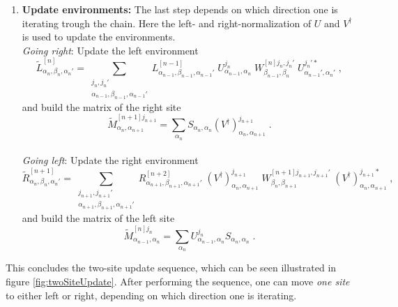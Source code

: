 \begin{enumerate}
\item
\textbf{Update environments:} The last step depends on which direction one is iterating trough the chain. Here the left- and right-normalization of $U$ and $V^{\dag}$ is used to update the environments.\\
\textit{Going right}: Update the left environment
\begin{equation}
	\tilde{L}_{\alpha_{n}, \beta_{n} , \alpha_{n} '}^{[n]} = \sum_{\substack{ j_{n} , j_{n} ' \\ \alpha_{n-1} , \beta_{n-1} , \alpha_{n-1} '}} L_{\alpha_{n-1}, \beta_{n-1} , \alpha_{n-1} '}^{[n-1]} \; U_{\alpha_{n-1} , \alpha_{n}}^{j_n} \; W_{\beta_{n-1} , \beta_{n}}^{[n] j_n , j_n '} \; U_{\alpha_{n-1} ', \alpha_{n}'}^{j_n ' *} \; ,
\end{equation}
and build the matrix of the right site
\begin{equation}
	\tilde{M}_{\alpha_{n} , \alpha_{n+1}}^{[n+1] j_{n+1} } = \sum_{\alpha_n}  S_{\alpha_n , \alpha_n} (V^{\dag})_{\alpha_{n} , \alpha_{n+1}}^{j_{n+1}} \; .
\end{equation}\\ 
\textit{Going left}: Update the right environment
\begin{equation}
	\tilde{R}_{\alpha_{n}, \beta_{n} , \alpha_{n} '}^{[n+1]} = \sum_{\substack{ j_{n+1} , j_{n+1} ' \\ \alpha_{n+1} , \beta_{n+1} , \alpha_{n+1} '}} R_{\alpha_{n+1}, \beta_{n+1} , \alpha_{n+1} '}^{[n+2]} \; \left( V^{\dag} \right)_{\alpha_{n} , \alpha_{n+1}}^{j_{n+1}} \; W_{\beta_{n} , \beta_{n+1}}^{[n+1] j_{n+1} , j_{n+1} '} \; \left( V^{\dag} \right)_{\alpha_{n} , \alpha_{n+1}}^{j_{n+1} *} \; ,
\end{equation}
and build the matrix of the left site
\begin{equation}
	\tilde{M}_{\alpha_{n-1} , \alpha_{n}}^{[n] j_{n} } = \sum_{\alpha_n} U_{\alpha_{n-1} , \alpha_{n}}^{j_n} S_{\alpha_n , \alpha_n}  \; .
\end{equation} 
 
\end{enumerate}
This concludes the two-site update sequence, which can be seen illustrated in figure \ref{fig:twoSiteUpdate}. After performing the sequence, one can move \textit{one site} to either left or right, depending on which direction one is iterating.

